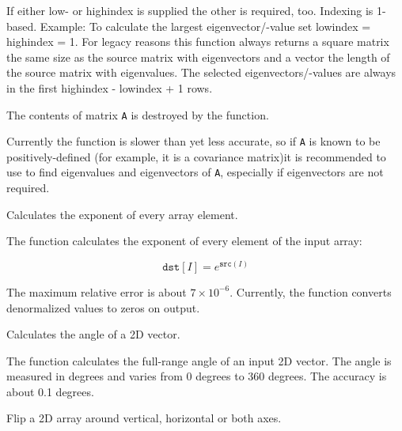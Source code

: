 If either low- or highindex is supplied the other is required, too.
Indexing is 1-based. Example: To calculate the largest eigenvector/-value set
lowindex = highindex = 1.
For legacy reasons this function always returns a square matrix the same size
as the source matrix with eigenvectors and a vector the length of the source
matrix with eigenvalues. The selected eigenvectors/-values are always in the
first highindex - lowindex + 1 rows.

The contents of matrix \texttt{A} is destroyed by the function.

Currently the function is slower than  yet less accurate,
so if \texttt{A} is known to be positively-defined (for example, it
is a covariance matrix)it is recommended to use  to find
eigenvalues and eigenvectors of \texttt{A}, especially if eigenvectors
are not required.

Calculates the exponent of every array element.


\begin{description}
\end{description}


The function calculates the exponent of every element of the input array:

\[
\texttt{dst} [I] = e^{\texttt{src}(I)}
\]

The maximum relative error is about $7 \times 10^{-6}$. Currently, the function converts denormalized values to zeros on output.

Calculates the angle of a 2D vector.


\begin{description}
\end{description}


The function calculates the full-range angle of an input 2D vector. The angle is 
measured in degrees and varies from 0 degrees to 360 degrees. The accuracy is about 0.1 degrees.

Flip a 2D array around vertical, horizontal or both axes.

